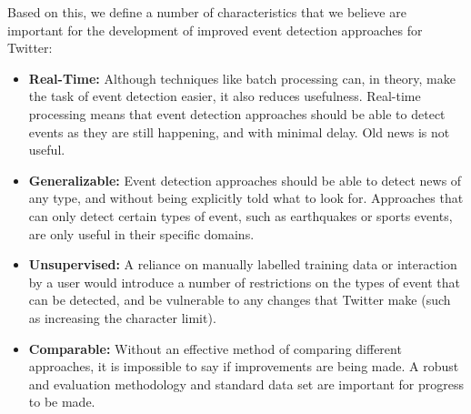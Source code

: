 Based on this, we define a number of characteristics that we believe are important for the development of improved event detection approaches for Twitter:
\begin{itemize}

	\item \textbf{Real-Time:} Although techniques like batch processing can, in theory, make the task of event detection easier, it also reduces usefulness.
	Real-time processing means that event detection approaches should be able to detect events as they are still happening, and with minimal delay.
	Old news is not useful. \\

	\item \textbf{Generalizable:} Event detection approaches should be able to detect news of any type, and without being explicitly told what to look for. Approaches that can only detect certain types of event, such as earthquakes or sports events, are only useful in their specific domains. \\

	\item \textbf{Unsupervised:} A reliance on manually labelled training data or interaction by a user would introduce a number of restrictions on the types of event that can be detected, and be vulnerable to any changes that Twitter make (such as increasing the character limit). \\

	\item \textbf{Comparable:} Without an effective method of comparing different approaches, it is impossible to say if improvements are being made. A robust and  evaluation methodology and standard data set are important for progress to be made.  \\

\end{itemize}

